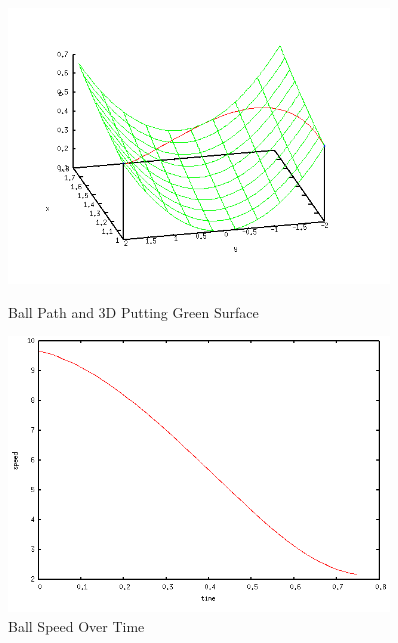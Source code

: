 \documentclass{article}
\begin{document}
\begin{figure}
\centering
\includegraphics[width=0.9\textwidth]{ball_path.png}
\caption{Ball Path and 3D Putting Green Surface}
\vspace{2 cm}
\includegraphics[width=0.9\textwidth]{ball_speed.png}
\caption{Ball Speed Over Time}
\end{figure}
\end{document}
